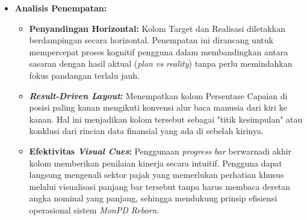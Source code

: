 \begin{itemize}
\begin{itemize}
        \item \textbf{Analisis Penempatan:}
            \begin{itemize}
                \item \textbf{Penyandingan Horizontal:} Kolom Target dan Realisasi diletakkan berdampingan secara horizontal. Penempatan ini dirancang untuk mempercepat proses kognitif pengguna dalam membandingkan antara sasaran dengan hasil aktual (\emph{plan vs reality}) tanpa perlu memindahkan fokus pandangan terlalu jauh.
                \item \textbf{\emph{Result-Driven Layout}:} Menempatkan kolom Persentase Capaian di posisi paling kanan mengikuti konvensi alur baca manusia dari kiri ke kanan. Hal ini menjadikan kolom tersebut sebagai "titik kesimpulan" atau konklusi dari rincian data finansial yang ada di sebelah kirinya.
                \item \textbf{Efektivitas \emph{Visual Cues}:} Penggunaan \emph{progress bar} berwarnadi akhir kolom memberikan penilaian kinerja secara intuitif. Pengguna dapat langsung mengenali sektor pajak yang memerlukan perhatian khusus melalui visualisasi panjang bar tersebut tanpa harus membaca deretan angka nominal yang panjang, sehingga mendukung prinsip efisiensi operasional sistem \emph{MonPD Reborn}.
            \end{itemize}
    \end{itemize}

\end{itemize}